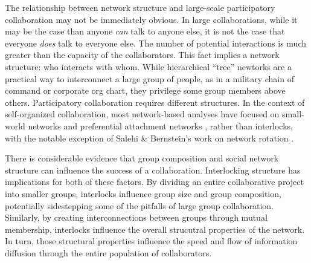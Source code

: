 \documentclass[manuscript,screen,review,acmsmall]{acmart}
\begin{document}
The relationship between network structure and large-scale participatory collaboration may not be immediately obvious.
In large collaborations, while it may be the case than anyone {\em can} talk to anyone else, it is not the case that everyone {\em does} talk to everyone else.
The number of potential interactions is much greater than the capacity of the collaborators.
This fact implies a network structure: who interacts with whom.
While hierarchical ``tree'' newtorks are a practical way to interconnect a large group of people,
as in a military chain of command or corporate org chart,
they privilege some group members above others.
Participatory collaboration requires different structures.
In the context of self-organized collaboration, most network-based analyses have focused on 
small-world networks \cite{watts_collective_1998}
and preferential attachment networks \cite{barabasi_emergence_1999},
rather than interlocks,
with the notable exception of Salehi \& Bernstein's work on network rotation \cite{salehi_hive:_2018}.

There is considerable evidence that group composition
\cite{hill_group_1982,
nishi_inequality_2015,
robert_jr_differences_2018,
sydow_diversity_2017,
lerner_diverse_2018,
arazy_information_2011}
and social network structure
\cite{
kearns_experiments_2012,
barkoczi_social_2016,
salehi_hive:_2018,
mason_propagation_2008,
mason_collaborative_2012}
can influence the success of a collaboration.
Interlocking structure has implications for both of these factors.
By dividing an entire collaborative project into smaller groups,
interlocks influence group size and group composition,
potentially sidestepping some of the pitfalls of large group collaboration.
Similarly, by creating interconnections between groups through mutual membership,
interlocks influence the overall strucutral properties of the network.
In turn, those structural properties influence the speed and flow of information diffusion through the entire population of collaborators.
\end{document}
